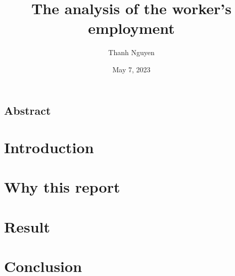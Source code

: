 \documentclass[12pt, a4paper]{article}
\title{The analysis of the worker's employment}
\author{Thanh Nguyen}
\date{May 7, 2023}
\begin{document}
\maketitle

\begin{center}
    \begin{minipage}{0.85\textwidth}
        \begin{center}\section*{\normalsize Abstract}\end{center}
        \begin{footnotesize}
            \blindtext[1]
        \end{footnotesize}
    \end{minipage}
\end{center}



\begin{multicols}{2}
    \section{Introduction}
    \Blindtext[1][1]

    \section{Why this report}
    \Blindtext[2][1]

    \section{Result}
    \Blindtext[3][1]

    \section{Conclusion}
    \Blindtext[1][1]


\end{multicols}
\end{document}
